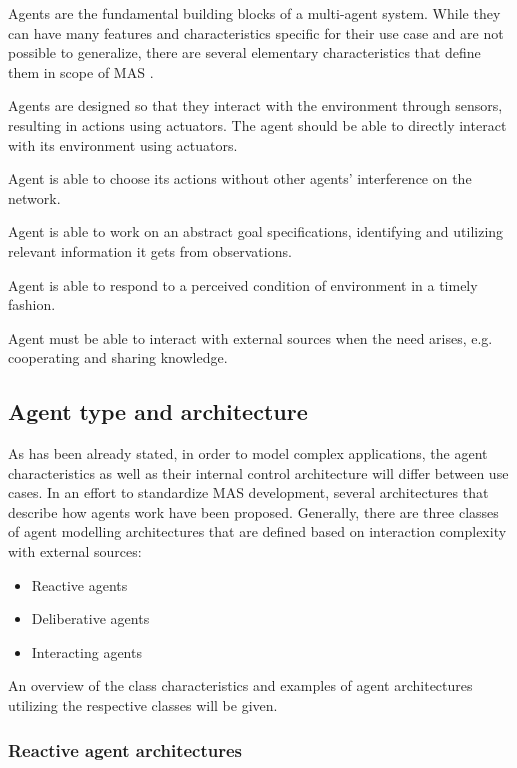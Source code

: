 \documentclass[main.tex]{subfiles}
\begin{document}
Agents are the fundamental building blocks of a multi-agent system. While they can have many
features and characteristics specific for their use case and are not possible to generalize,
there are several elementary characteristics that define them in scope of MAS
\cite{ParasumannaGokulan2010}.

Agents are designed so that they interact with the environment through sensors,
resulting in actions using actuators.  The agent should be able to directly interact with its
environment using actuators.

Agent is able to choose its actions without other agents' interference on the network.

Agent is able to work on an abstract goal specifications, identifying and utilizing relevant
information it gets from observations.

Agent is able to respond to a perceived condition of environment in a timely fashion.

Agent must be able to interact with external sources when the need arises, e.g. cooperating
and sharing knowledge.

\subsection{Agent type and architecture}

As has been already stated, in order to model complex applications, the agent characteristics as
well as their internal control architecture will differ between use cases. In an effort to standardize
MAS development, several architectures that describe how agents work have been proposed. Generally,
there are three classes of agent modelling architectures that are defined based on interaction
complexity with external sources:

\begin{itemize}
    \item Reactive agents
    \item Deliberative agents
    \item Interacting agents
\end{itemize}

An overview of the class characteristics and examples of agent architectures utilizing
the respective classes will be given.

\subsubsection{Reactive agent architectures}
\end{document}
